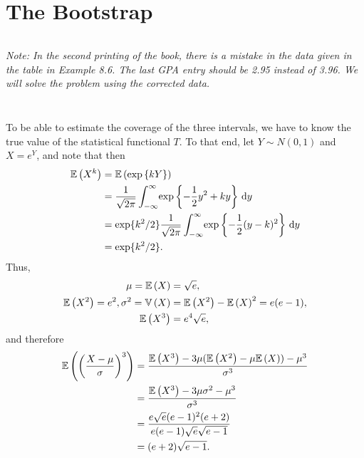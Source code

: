 \chapter{The Bootstrap}

\inputminted{python}{../code/bootstrap.py}

\begin{ex}
  \textit{Note: In the second printing of the book, there is a mistake in the
    data given in the table in Example 8.6. The last GPA entry should be 2.95
    instead of 3.96. We will solve the problem using the corrected data.}

  \inputminted{python}{../code/08-01.py}
  \inputminted{text}{../output/08-01.txt}
\end{ex}

\begin{ex}
  To be able to estimate the coverage of the three intervals, we have to know
  the true value of the statistical functional $T$. To that end, let
  $Y\sim N(0, 1)$ and $X=e^Y$, and note that then
  \begin{align*}
    \mathbb{E}\left(X^k\right)
     & =\mathbb{E}\left(\exp\left\{kY\right\}\right)                                 \\
     & =\frac{1}{\sqrt{2\pi}}\int_{-\infty}^\infty\!
    \exp\left\{-\frac{1}{2}y^2+ky\right\}\,\mathrm{d}{y}                  \\
     & =\exp\{k^2/2\}\frac{1}{\sqrt{2\pi}}\int_{-\infty}^\infty\!
    \exp\left\{-\frac{1}{2}(y-k)^2\right\}\,\mathrm{d}{y}                 \\
     & =\exp\{k^2/2\}.
  \end{align*}
  Thus,
  \begin{align*}
    \mu = \mathbb{E}\left(X\right)        & =\sqrt{e},               \\
    \mathbb{E}\left(X^2\right)           =e^2,
    \sigma^2 = \mathbb{V}\left(X\right) & =\mathbb{E}\left(X^2\right)-\mathbb{E}\left(X\right)^2=e(e-1), \\
    \mathbb{E}\left(X^3\right)            & =e^4\sqrt{e},
  \end{align*}
  and therefore
  \begin{align*}
    \mathbb{E}\left(\left(\frac{X-\mu}{\sigma}\right)^3\right)
     & =\frac{\mathbb{E}\left(X^3\right)-3\mu(\mathbb{E}\left(X^2\right) - \mu\mathbb{E}\left(X\right))-\mu^3}{\sigma^3} \\
     & =\frac{\mathbb{E}\left(X^3\right)-3\mu\sigma^2-\mu^3}{\sigma^3}             \\
     & =\frac{e\sqrt{e}(e-1)^2(e+2)}{e(e-1)\sqrt{e}\sqrt{e-1}}  \\
     & =(e+2)\sqrt{e-1}.
  \end{align*}

  \inputminted{python}{../code/08-02.py}
  \inputminted{text}{../output/08-02.txt}
\end{ex}

